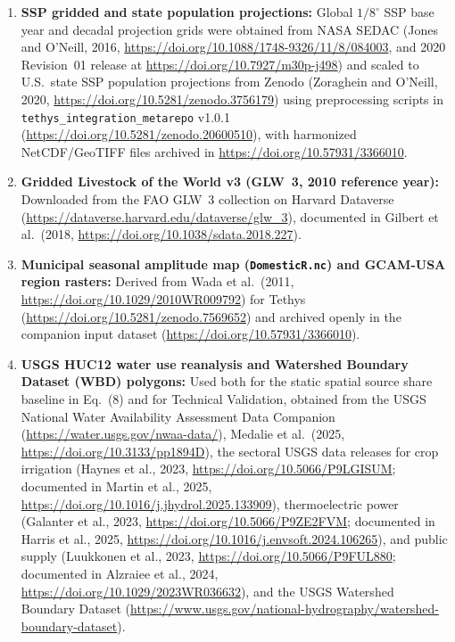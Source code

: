 \documentclass[11pt,letterpaper]{article}
\begin{document}
{\begin{enumerate}[label=\alph*), leftmargin=1.6em, topsep=2pt, itemsep=2pt]
  \item \textbf{SSP gridded and state population projections:} Global $1/8^{\circ}$ SSP base year and decadal projection grids were obtained from NASA SEDAC (Jones and O'Neill, 2016, \url{https://doi.org/10.1088/1748-9326/11/8/084003}, and 2020 Revision~01 release at \url{https://doi.org/10.7927/m30p-j498}) and scaled to U.S.\ state SSP population projections from Zenodo (Zoraghein and O'Neill, 2020, \url{https://doi.org/10.5281/zenodo.3756179}) using preprocessing scripts in \texttt{tethys\_integration\_metarepo} v1.0.1 (\url{https://doi.org/10.5281/zenodo.20600510}), with harmonized NetCDF/GeoTIFF files archived in \url{https://doi.org/10.57931/3366010}.
  \item \textbf{Gridded Livestock of the World v3 (GLW~3, 2010 reference year):} Downloaded from the FAO GLW~3 collection on Harvard Dataverse (\url{https://dataverse.harvard.edu/dataverse/glw_3}), documented in Gilbert et al.\ (2018, \url{https://doi.org/10.1038/sdata.2018.227}).
  \item \textbf{Municipal seasonal amplitude map (\texttt{DomesticR.nc}) and GCAM-USA region rasters:} Derived from Wada et al.\ (2011, \url{https://doi.org/10.1029/2010WR009792}) for Tethys (\url{https://doi.org/10.5281/zenodo.7569652}) and archived openly in the companion input dataset (\url{https://doi.org/10.57931/3366010}).
  \item \textbf{USGS HUC12 water use reanalysis and Watershed Boundary Dataset (WBD) polygons:} Used both for the static spatial source share baseline in Eq.~(8) and for Technical Validation, obtained from the USGS National Water Availability Assessment Data Companion (\url{https://water.usgs.gov/nwaa-data/}), Medalie et al.\ (2025, \url{https://doi.org/10.3133/pp1894D}), the sectoral USGS data releases for crop irrigation (Haynes et al., 2023, \url{https://doi.org/10.5066/P9LGISUM}; documented in Martin et al., 2025, \url{https://doi.org/10.1016/j.jhydrol.2025.133909}), thermoelectric power (Galanter et al., 2023, \url{https://doi.org/10.5066/P9ZE2FVM}; documented in Harris et al., 2025, \url{https://doi.org/10.1016/j.envsoft.2024.106265}), and public supply (Luukkonen et al., 2023, \url{https://doi.org/10.5066/P9FUL880}; documented in Alzraiee et al., 2024, \url{https://doi.org/10.1029/2023WR036632}), and the USGS Watershed Boundary Dataset (\url{https://www.usgs.gov/national-hydrography/watershed-boundary-dataset}).
\end{enumerate}

}
\end{document}
